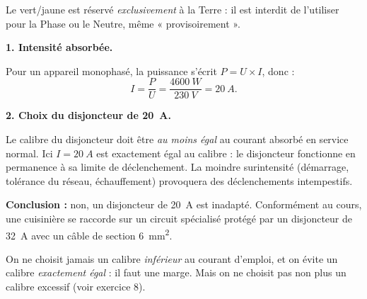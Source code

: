 \documentclass[11pt]{article}
\begin{document}
\begin{attention}
Le vert/jaune est réservé \emph{exclusivement} à la Terre : il est interdit de l'utiliser pour la Phase ou le Neutre, même « provisoirement ».
\end{attention}

\begin{corrige}
\textbf{1. Intensité absorbée.}

Pour un appareil monophasé, la puissance s'écrit $P = U \times I$, donc :
\[
I = \frac{P}{U} = \frac{\SI{4600}{W}}{\SI{230}{V}} = \SI{20}{A}.
\]

\textbf{2. Choix du disjoncteur de \SI{20}{A}.}

Le calibre du disjoncteur doit être \emph{au moins égal} au courant absorbé en service normal. Ici $I = \SI{20}{A}$ est exactement égal au calibre : le disjoncteur fonctionne en permanence à sa limite de déclenchement. La moindre surintensité (démarrage, tolérance du réseau, échauffement) provoquera des déclenchements intempestifs.

\textbf{Conclusion :} non, un disjoncteur de \SI{20}{A} est inadapté. Conformément au cours, une cuisinière se raccorde sur un circuit spécialisé protégé par un disjoncteur de \SI{32}{A} avec un câble de section \SI{6}{mm^2}.
\end{corrige}

\begin{attention}
On ne choisit jamais un calibre \emph{inférieur} au courant d'emploi, et on évite un calibre \emph{exactement égal} : il faut une marge. Mais on ne choisit pas non plus un calibre excessif (voir exercice 8).
\end{attention}
\end{document}
